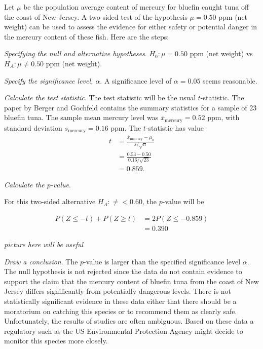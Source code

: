 \begin{spacing}{1.5}
\begin{example}
Let $\mu$ be the population average content of mercury for bluefin caught tuna off the coast of New Jersey. A two-sided test of the hypothesis $\mu = 0.50$ ppm (net weight) can be used to assess the evidence for either safety or potential danger in the mercury content of these fish.  Here are the steps:

\textit{Specifying the  null and alternative hypotheses}.   $H_0: \mu = 0.50$ ppm (net weight) vs $H_A: \mu \neq 0.50$ ppm (net weight).

\textit{Specify the significance level, $\alpha$}.  A significance level of $\alpha = 0.05$ seems reasonable. 


\textit{Calculate the test statistic}.  The test statistic will be the usual $t$-statistic. The paper by Berger and Gochfeld contains the summary statistics for a sample of 23 bluefin tuna.  The sample mean mercury level was $\overline{x}_{\text{mercury}} = 0.52$ ppm, with standard deviation $s_{\text{mercury}}= 0.16$ ppm.  The  $t$-statistic has value
\begin{align*}
t &= \frac{\overline{x}_{\text{mercury}}-\mu_0}{s/\sqrt{n}} \\
  &= \frac{0.53 - 0.50} {0.16/\sqrt{23}} \\
  &= 0.859.
\end{align*}

\textit{Calculate the $p$-value}.

For this two-sided alternative $H_A: \neq < 0.60$, the $p$-value will be 

\begin{align*}
	P(Z \leq -t) + P(Z \geq t)&= 2P(Z \leq - 0.859) \\
	&= 0.390
\end{align*}



\textit{picture here will be useful}

\textit{Draw a conclusion}.  The $p$-value is larger than the specified significance level $\alpha$.  The null hypothesis is not rejected since the data do not contain evidence to support the claim that the mercury content of bluefin tuna from the coast of New Jersey differs significantly from  potentially dangerous levels.  There is not statistically significant evidence in these data either that there should be a moratorium on catching this species or to recommend them as clearly safe.  Unfortunately, the results of studies are often ambiguous.  Based on these data a regulatory such as the US Environmental Protection Agency might decide to monitor this species more closely.


\end{example}
\end{spacing}
